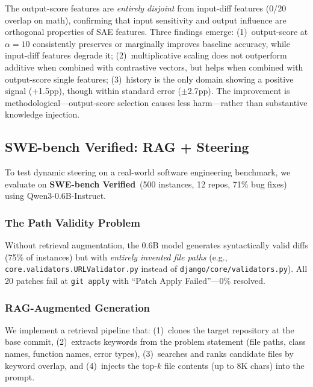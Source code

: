 \documentclass[11pt,a4paper]{article}
\begin{document}
The output-score features are \textit{entirely disjoint} from input-diff features (0/20 overlap on math), confirming that input sensitivity and output influence are orthogonal properties of SAE features. Three findings emerge: (1)~output-score at $\alpha=10$ consistently preserves or marginally improves baseline accuracy, while input-diff features degrade it; (2)~multiplicative scaling does not outperform additive when combined with contrastive vectors, but helps when combined with output-score single features; (3)~history is the only domain showing a positive signal (+1.5pp), though within standard error ($\pm$2.7pp). The improvement is methodological---output-score selection causes less harm---rather than substantive knowledge injection.

\subsection{SWE-bench Verified: RAG + Steering}
\label{sec:swebench}

To test dynamic steering on a real-world software engineering benchmark, we evaluate on \textbf{SWE-bench Verified}~(500 instances, 12 repos, 71\% bug fixes) using Qwen3-0.6B-Instruct.

\subsubsection{The Path Validity Problem}
Without retrieval augmentation, the 0.6B model generates syntactically valid diffs (75\% of instances) but with \textit{entirely invented file paths} (e.g., \texttt{core.validators.URLValidator.py} instead of \texttt{django/core/validators.py}). All 20 patches fail at \texttt{git apply} with ``Patch Apply Failed''---0\% resolved.

\subsubsection{RAG-Augmented Generation}
We implement a retrieval pipeline that: (1)~clones the target repository at the base commit, (2)~extracts keywords from the problem statement (file paths, class names, function names, error types), (3)~searches and ranks candidate files by keyword overlap, and (4)~injects the top-$k$ file contents (up to 8K chars) into the prompt.
\end{document}
